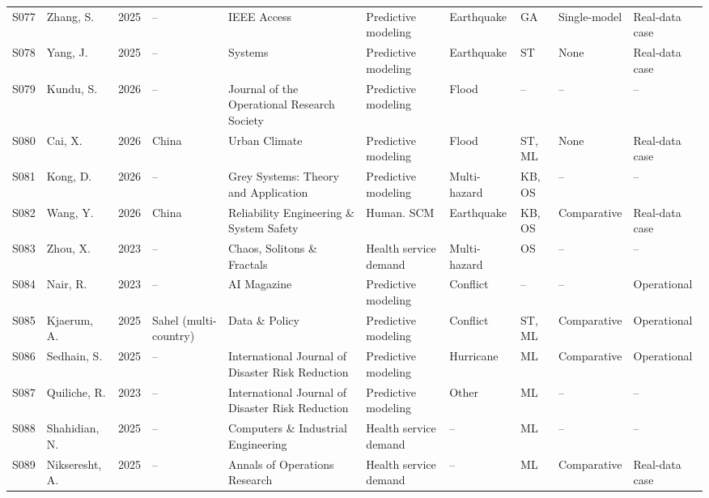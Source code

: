 \begin{landscape}
\begin{longtable}{@{}L{0.9cm}L{2.9cm}L{0.8cm}L{2.1cm}L{3.1cm}L{2.4cm}L{2.0cm}L{1.8cm}L{2.1cm}L{2.0cm}@{}}
S077 & Zhang, S. \cite{Zhang2025RAGEarthquakeMaterial} & 2025 & -- & IEEE Access & Predictive modeling & Earthquake & GA & Single-model & Real-data case \\
S078 & Yang, J. \cite{Yang2025CasualtyEmergencyMaterial} & 2025 & -- & Systems & Predictive modeling & Earthquake & ST & None & Real-data case \\
S079 & Kundu, S. \cite{Kundu2026ReliefFloodPrediction} & 2026 & -- & Journal of the Operational Research Society & Predictive modeling & Flood & -- & -- & -- \\
S080 & Cai, X. \cite{Cai2026SpatialFloodSupplyDemand} & 2026 & China & Urban Climate & Predictive modeling & Flood & ST, ML & None & Real-data case \\
S081 & Kong, D. \cite{Kong2026GreyEmergencyMaterial} & 2026 & -- & Grey Systems: Theory and Application & Predictive modeling & Multi-hazard & KB, OS & -- & -- \\
S082 & Wang, Y. \cite{Wang2026EmergencySuppliesScheduling} & 2026 & China & Reliability Engineering \& System Safety & Human. SCM & Earthquake & KB, OS & Comparative & Real-data case \\
S083 & Zhou, X. \cite{Zhou2023AgentEmergencyMedical} & 2023 & -- & Chaos, Solitons \& Fractals & Health service demand & Multi-hazard & OS & -- & -- \\
S084 & Nair, R. \cite{Nair2023ExplainableHumanitarianNeeds} & 2023 & -- & AI Magazine & Predictive modeling & Conflict & -- & -- & Operational \\
S085 & Kjaerum, A. \cite{Kjaerum2025DisplacementAnticipatory} & 2025 & Sahel (multi-country) & Data \& Policy & Predictive modeling & Conflict & ST, ML & Comparative & Operational \\
S086 & Sedhain, S. \cite{Sedhain2025ImpactBasedCycloneForecasting} & 2025 & -- & International Journal of Disaster Risk Reduction & Predictive modeling & Hurricane & ML & Comparative & Operational \\
S087 & Quiliche, R. \cite{Quiliche2023ColdWaveRiskML} & 2023 & -- & International Journal of Disaster Risk Reduction & Predictive modeling & Other & ML & -- & -- \\
S088 & Shahidian, N. \cite{Shahidian2025EMSDemandMachineLearning} & 2025 & -- & Computers \& Industrial Engineering & Health service demand & -- & ML & -- & -- \\
S089 & Nikseresht, A. \cite{Nikseresht2025BloodDemandEnsemble} & 2025 & -- & Annals of Operations Research & Health service demand & -- & ML & Comparative & Real-data case \\

\end{longtable}
\end{landscape}
